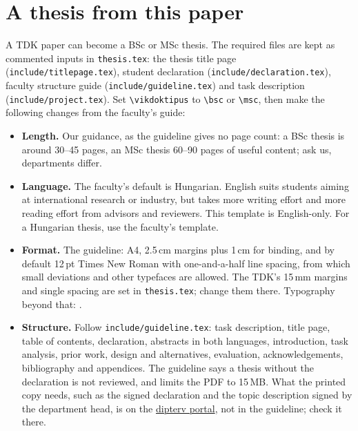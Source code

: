 \section{A thesis from this paper}\label{guide:tdk:thesis}
A TDK paper can become a BSc or MSc thesis. The required files are kept as commented inputs in \texttt{thesis.tex}: the thesis title page (\texttt{include/titlepage.tex}), student declaration (\texttt{include/declaration.tex}), faculty structure guide (\texttt{include/guideline.tex}) and task description (\texttt{include/project.tex}). Set \texttt{\textbackslash vikdoktipus} to \texttt{\textbackslash bsc} or \texttt{\textbackslash msc}, then make the following changes from the faculty's guide:
\begin{itemize}[noitemsep]
  \item \textbf{Length.} Our guidance, as the guideline gives no page count: a BSc thesis is around 30--45 pages, an MSc thesis 60--90 pages of useful content; ask us, departments differ.
  \item \textbf{Language.} The faculty's default is Hungarian. English suits students aiming at international research or industry, but takes more writing effort and more reading effort from advisors and reviewers. This template is English-only. For a Hungarian thesis, use the faculty's template.
  \item \textbf{Format.} The guideline: A4, 2.5\,cm margins plus 1\,cm for binding, and by default 12\,pt Times New Roman with one-and-a-half line spacing, from which small deviations and other typefaces are allowed. The TDK's 15\,mm margins and single spacing are set in \texttt{thesis.tex}; change them there. Typography beyond that: \citet{guide:Jeney}.
  \item \textbf{Structure.} Follow \texttt{include/guideline.tex}: task description, title page, table of contents, declaration, abstracts in both languages, introduction, task analysis, prior work, design and alternatives, evaluation, acknowledgements, bibliography and appendices. The guideline says a thesis without the declaration is not reviewed, and limits the PDF to 15\,MB. What the printed copy needs, such as the signed declaration and the topic description signed by the department head, is on the \href{https://diplomaterv.vik.bme.hu/}{dipterv portal}, not in the guideline; check it there.
\end{itemize}
